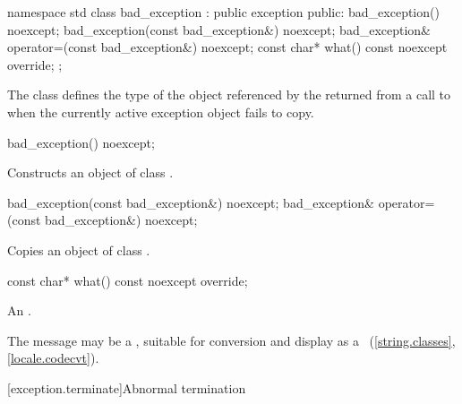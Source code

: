%
\begin{codeblock}
namespace std {
  class bad_exception : public exception {
  public:
    bad_exception() noexcept;
    bad_exception(const bad_exception&) noexcept;
    bad_exception& operator=(const bad_exception&) noexcept;
    const char* what() const noexcept override;
  };
}
\end{codeblock}

\pnum
The class
defines the type of the object
referenced by the 
returned from a call to 
when the currently active exception object fails to copy.

%
\begin{itemdecl}
bad_exception() noexcept;
\end{itemdecl}

\begin{itemdescr}
\pnum
\effects
Constructs an object of class
.
\end{itemdescr}

%
%
\begin{itemdecl}
bad_exception(const bad_exception&) noexcept;
bad_exception& operator=(const bad_exception&) noexcept;
\end{itemdecl}

\begin{itemdescr}
\pnum
\effects
Copies an object of class
.
\end{itemdescr}

%
\begin{itemdecl}
const char* what() const noexcept override;
\end{itemdecl}

\begin{itemdescr}
\pnum
\returns
An  \ntbs{}.

\pnum
\remarks
The message may be a
,
suitable for conversion and display as a
~(\ref{string.classes}, \ref{locale.codecvt}).
\end{itemdescr}

[exception.terminate]{Abnormal termination}

